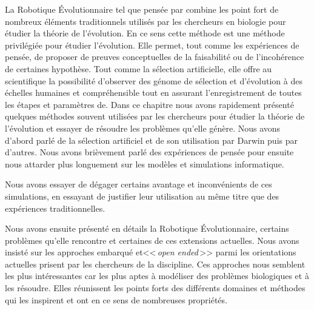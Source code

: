 La Robotique \'Evolutionnaire tel que pensée par \cite{bredeche2012environmentdrivenopenende} combine les point fort de nombreux éléments traditionnels utilisés par les chercheurs en biologie pour étudier la théorie de l'évolution. En ce sens cette méthode est une méthode privilégiée pour étudier l'évolution. Elle permet, tout comme les expériences de pensée, de proposer de preuves conceptuelles de la faisabilité ou de l'incohérence de certaines hypothèse. Tout comme la sélection artificielle, elle offre au scientifique la possibilité d'observer des génome de sélection et d'évolution à des échelles humaines et compréhensible tout en assurant l'enregistrement de toutes les étapes et paramètres de.
Dans ce chapitre nous avons rapidement présenté quelques méthodes souvent utilisées par les chercheurs pour étudier la théorie de l'évolution et essayer de résoudre les problèmes qu'elle génère. Nous avons d'abord parlé de la sélection artificiel et de son utilisation par Darwin puis par d'autres. Nous avons brièvement parlé des expériences de pensée pour ensuite nous attarder plus longuement sur les modèles et simulations informatique.

Nous avons essayer de dégager certains avantage et inconvénients de ces simulations, en essayant de justifier leur utilisation au même titre que des expériences traditionnelles.

Nous avons ensuite présenté en détails la Robotique \'Evolutionnaire, certains problèmes qu'elle rencontre et certaines de ces extensions actuelles. Nous avons insisté sur les approches embarqué et<<\,\emph{open ended}\,>> parmi les orientations actuelles prisent par les chercheurs de la discipline. Ces approches nous semblent les plus intéressantes car les plus aptes à modéliser des problèmes biologiques et à les résoudre. Elles réunissent les points forts des différents domaines et méthodes qui les inspirent et ont en ce sens de nombreuses propriétés.
